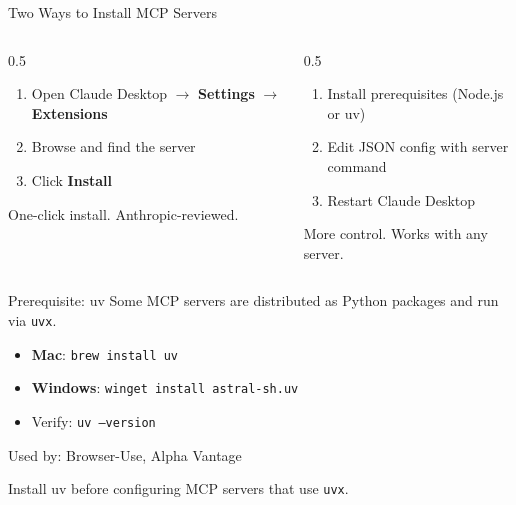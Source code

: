 \documentclass[aspectratio=169]{beamer}
\begin{document}
\begin{frame}{Two Ways to Install MCP Servers}
\begin{columns}[T]
\begin{column}{0.5\textwidth}
\begin{shadedbox}[title=\textbf{Desktop Extensions (Easy)}]
\begin{enumerate}\small
  \item Open Claude Desktop $\rightarrow$ \textbf{Settings} $\rightarrow$ \textbf{Extensions}
  \item Browse and find the server
  \item Click \textbf{Install}
\end{enumerate}
\vspace{0.2cm}
One-click install. Anthropic-reviewed.
\end{shadedbox}
\end{column}
\begin{column}{0.5\textwidth}
\begin{shadedbox}[title=\textbf{Manual Configuration}]
\begin{enumerate}\small
  \item Install prerequisites (Node.js or uv)
  \item Edit JSON config with server command
  \item Restart Claude Desktop
\end{enumerate}
\vspace{0.2cm}
More control. Works with any server.
\end{shadedbox}
\end{column}
\end{columns}
\end{frame}

\begin{frame}[fragile]{Prerequisite: uv}
Some MCP servers are distributed as Python packages and run via \texttt{uvx}.
\vspace{0.3cm}
\begin{shadedbox}[title=\textbf{uv} (for \texttt{uvx} servers)]
\begin{itemize}\small
  \item \textbf{Mac}: \texttt{brew install uv}
  \item \textbf{Windows}: \texttt{winget install astral-sh.uv}
  \item Verify: \texttt{uv --version}
\end{itemize}
\vspace{0.1cm}
{\scriptsize Used by: Browser-Use, Alpha Vantage}
\end{shadedbox}
\vspace{0.3cm}
\begin{center}\small
\alert{Install uv before configuring MCP servers that use \texttt{uvx}.}
\end{center}
\end{frame}
\end{document}
